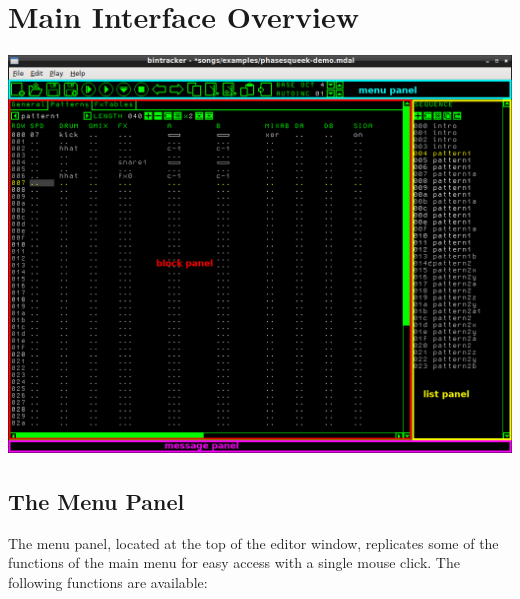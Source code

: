 \documentclass[12pt]{report}	%
\begin{document}
\section{Main Interface Overview}

{\includegraphics[width=\textwidth]{overview}}

\subsection{The Menu Panel}

The menu panel, located at the top of the editor window, replicates some of the functions of the main menu for easy access with a single mouse click. The following functions are available:
\end{document}
